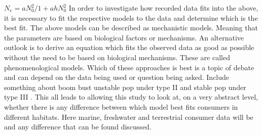 \documentclass[a4paper]{article}
\numberwithin{equation}{section}
\begin{document}
$N_e = aN_0^2  / 1+ahN_0^2$
\newline
In order to investigate how recorded data fits into the above, it is necessary to fit the respective models to the data and determine which is the best fit.  The above models can be described as mechanistic models.  Meaning that the parameters are based on biological factors or mechanisms.  An alternative outlook is to derive an equation which fits the observed data as good as possible without the need to be based on biological mechanisms.  These are called phenomenological models.  Which of these approaches is best is a topic of debate and can depend on the data being used or question being asked.  
\newline
Include something about boom bust unstable pop under type II and stable pop under type III \cite{Vucic-Pestic2010}.
\newline
This all leads to allowing this study to look at, on a very abstract level, whether there is any difference between which model best fits consumers in different habitats.  Here marine, freshwater and terrestrial consumer data will be and any difference that can be found discussed.



\newpage
\end{document}
